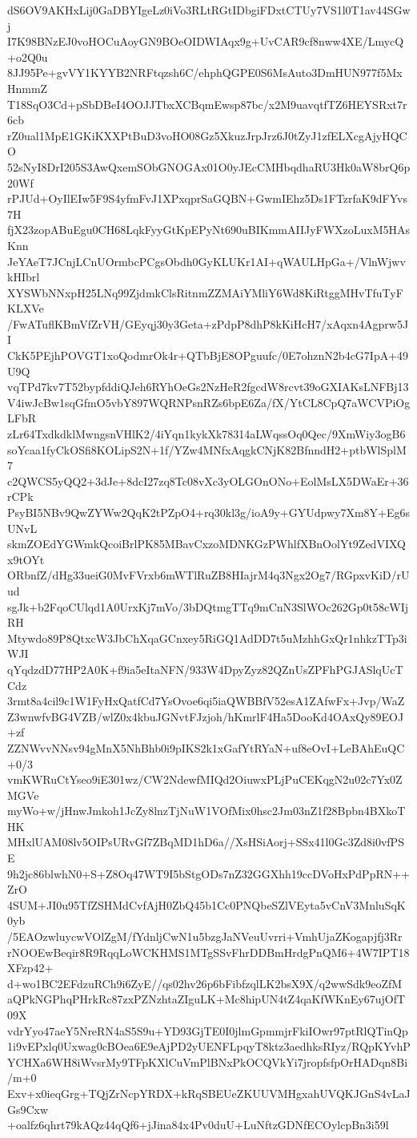 dS6OV9AKHxLij0GaDBYIgeLz0iVo3RLtRGtIDbgiFDxtCTUy7VS1l0T1av44SGwj
I7K98BNzEJ0voHOCuAoyGN9BOeOIDWIAqx9g+UvCAR9cf8nww4XE/LmycQ+o2Q0u
8JJ95Pe+gvVY1KYYB2NRFtqzsh6C/ehphQGPE0S6MsAuto3DmHUN977f5MxHnmmZ
T18SqO3Cd+pSbDBeI4OOJJTbxXCBqmEwsp87bc/x2M9uavqtfTZ6HEYSRxt7r6cb
rZ0ual1MpE1GKiKXXPtBuD3voHO08Gz5XkuzJrpJrz6J0tZyJ1zfELXcgAjyHQCO
52sNyI8DrI205S3AwQxemSObGNOGAx01O0yJEcCMHbqdhaRU3Hk0aW8brQ6p20Wf
rPJUd+OyIlEIw5F9S4yfmFvJ1XPxqprSaGQBN+GwmIEhz5Ds1FTzrfaK9dFYvs7H
fjX23zopABuEgu0CH68LqkFyyGtKpEPyNt690uBIKmmAIIJyFWXzoLuxM5HAsKnn
JeYAeT7JCnjLCnUOrmbcPCgsObdh0GyKLUKr1AI+qWAULHpGa+/VlnWjwvkHIbrl
XYSWbNNxpH25LNq99ZjdmkClsRitnmZZMAiYMliY6Wd8KiRtggMHvTfuTyFKLXVe
/FwATuflKBmVfZrVH/GEyqj30y3Geta+zPdpP8dhP8kKiHcH7/xAqxn4Agprw5JI
CkK5PEjhPOVGT1xoQodmrOk4r+QTbBjE8OPguufc/0E7ohznN2b4cG7IpA+49U9Q
vqTPd7kv7T52bypfddiQJeh6RYhOeGs2NzHeR2fgcdW8rcvt39oGXIAKsLNFBj13
V4iwJcBw1sqGfmO5vbY897WQRNPsnRZs6bpE6Za/fX/YtCL8CpQ7aWCVPiOgLFbR
zLr64TxdkdklMwngsnVHlK2/4iYqn1kykXk78314aLWqssOq0Qec/9XmWiy3ogB6
soYcaa1fyCkOSfi8KOLipS2N+1f/YZw4MNfxAqgkCNjK82BfnndH2+ptbWlSplM7
c2QWCS5yQQ2+3dJe+8dcI27zq8Tc08vXc3yOLGOnONo+EolMsLX5DWaEr+36rCPk
PsyBI5NBv9QwZYWw2QqK2tPZpO4+rq30kl3g/ioA9y+GYUdpwy7Xm8Y+Eg6sUNvL
skmZOEdYGWmkQcoiBrlPK85MBavCxzoMDNKGzPWhlfXBnOolYt9ZedVIXQx9tOYt
ORbnfZ/dHg33ueiG0MvFVrxb6mWTlRuZB8HIajrM4q3Ngx2Og7/RGpxvKiD/rUud
sgJk+b2FqoCUlqd1A0UrxKj7mVo/3bDQtmgTTq9mCnN3SlWOc262Gp0t58cWIjRH
Mtywdo89P8QtxcW3JbChXqaGCnxey5RiGQ1AdDD7t5uMzhhGxQr1nhkzTTp3iWJI
qYqdzdD77HP2A0K+f9ia5eItaNFN/933W4DpyZyz82QZnUsZPFhPGJASlqUcTCdz
3rmt8a4cil9c1W1FyHxQatfCd7YsOvoe6qi5iaQWBBfV52esA1ZAfwFx+Jvp/WaZ
Z3wnwfvBG4VZB/wlZ0x4kbuJGNvtFJzjoh/hKmrlF4Ha5DooKd4OAxQy89EOJ+zf
ZZNWvvNNsv94gMnX5NhBhb0i9pIKS2k1xGafYtRYaN+uf8eOvI+LeBAhEuQC+0/3
vmKWRuCtYseo9iE301wz/CW2NdewfMIQd2OiuwxPLjPuCEKqgN2u02c7Yx0ZMGVe
myWo+w/jHnwJmkoh1JcZy8lnzTjNuW1VOfMix0hsc2Jm03nZ1f28Bpbn4BXkoTHK
MHxlUAM08lv5OIPsURvGf7ZBqMD1hD6a//XsHSiAorj+SSx41l0Gc3Zd8i0vfPSE
9h2jc86blwhN0+S+Z8Oq47WT9I5bStgODs7nZ32GGXhh19ccDVoHxPdPpRN++ZrO
4SUM+JI0u95TfZSHMdCvfAjH0ZbQ45b1Cc0PNQbeSZlVEyta5vCnV3MnluSqK0yb
/5EAOzwluycwVOlZgM/fYdnljCwN1u5bzgJaNVeuUvrri+VmhUjaZKogapjfj3Rr
rNOOEwBeqir8R9RqqLoWCKHMS1MTgSSvFhrDDBmHrdgPnQM6+4W7IPT18XFzp42+
d+wo1BC2EFdzuRCh9i6ZyE//qs02hv26p6bFibfzqlLK2bsX9X/q2wwSdk9eoZfM
aQPkNGPhqPHrkRc87zxPZNzhtaZIguLK+Mc8hipUN4tZ4qaKfWKnEy67ujOfT09X
vdrYyo47aeY5NreRN4aS5S9u+YD93GjTE0I0jlmGpmmjrFkiIOwr97ptRlQTinQp
1i9vEPxlq0Uxwag0cBOea6E9eAjPD2yUENFLpqyT8ktz3aedhksRIyz/RQpKYvhP
YCHXa6WH8iWvsrMy9TFpKXlCuVmPlBNxPkOCQVkYi7jropfsfpOrHADqn8Bi/m+0
Exv+x0ieqGrg+TQjZrNcpYRDX+kRqSBEUeZKUUVMHgxahUVQKJGnS4vLaJGs9Cxw
+oalfz6qhrt79kAQz44qQf6+jJina84x4Pv0duU+LuNftzGDNfECOylcpBn3i59l
